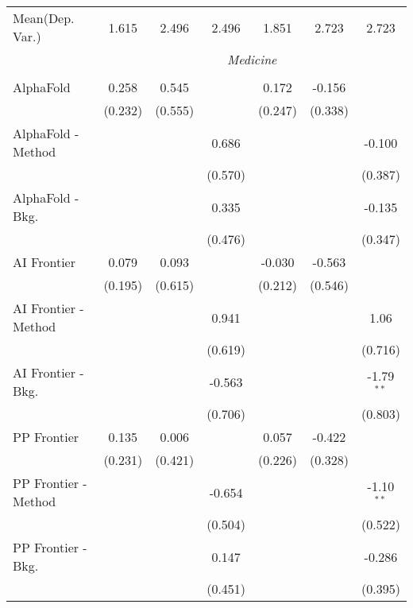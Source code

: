 \begin{tabular}{lcccccc}
Mean(Dep. Var.) & 1.615 & 2.496 & 2.496 & 1.851 & 2.723 & 2.723 \\
 & \multicolumn{6}{c}{\textit{Medicine}} \\ \\
   AlphaFold            & 0.258   & 0.545       &         & 0.172   & -0.156  &   \\   
                        & (0.232) & (0.555)     &         & (0.247) & (0.338) &   \\   
   AlphaFold - Method   &         &             & 0.686   &         &         & -0.100\\   
                        &         &             & (0.570) &         &         & (0.387)\\   
   AlphaFold - Bkg.     &         &             & 0.335   &         &         & -0.135\\   
                        &         &             & (0.476) &         &         & (0.347)\\   
   AI Frontier          & 0.079   & 0.093       &         & -0.030  & -0.563  &   \\   
                        & (0.195) & (0.615)     &         & (0.212) & (0.546) &   \\   
   AI Frontier - Method &         &             & 0.941   &         &         & 1.06\\   
                        &         &             & (0.619) &         &         & (0.716)\\   
   AI Frontier - Bkg.   &         &             & -0.563  &         &         & -1.79$^{**}$\\   
                        &         &             & (0.706) &         &         & (0.803)\\   
   PP Frontier          & 0.135   & 0.006       &         & 0.057   & -0.422  &   \\   
                        & (0.231) & (0.421)     &         & (0.226) & (0.328) &   \\   
   PP Frontier - Method &         &             & -0.654  &         &         & -1.10$^{**}$\\   
                        &         &             & (0.504) &         &         & (0.522)\\   
   PP Frontier - Bkg.   &         &             & 0.147   &         &         & -0.286\\   
                        &         &             & (0.451) &         &         & (0.395)\\   

\end{tabular}
